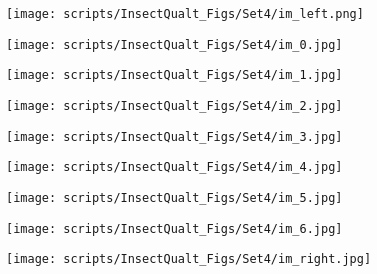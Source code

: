 \documentclass[10pt,twocolumn,letterpaper]{article}
\begin{document}
\begin{figure*}[t]
\begin{center}
    \begin{subfigure}[b]{0.1\textwidth}
        \centering
        \texttt{[image: scripts/InsectQualt\_Figs/Set4/im\_left.png]}
    \end{subfigure}
    \hfill
    \begin{subfigure}[b]{0.1\textwidth}
        \centering
        \texttt{[image: scripts/InsectQualt\_Figs/Set4/im\_0.jpg]}
    \end{subfigure}
    \hfill
    \begin{subfigure}[b]{0.1\textwidth}
        \centering
        \texttt{[image: scripts/InsectQualt\_Figs/Set4/im\_1.jpg]}
    \end{subfigure}
    \hfill
    \begin{subfigure}[b]{0.1\textwidth}
        \centering
        \texttt{[image: scripts/InsectQualt\_Figs/Set4/im\_2.jpg]}
    \end{subfigure}
    \hfill
    \begin{subfigure}[b]{0.1\textwidth}
        \centering
        \texttt{[image: scripts/InsectQualt\_Figs/Set4/im\_3.jpg]}
    \end{subfigure}
    \hfill
    \begin{subfigure}[b]{0.1\textwidth}
        \centering
        \texttt{[image: scripts/InsectQualt\_Figs/Set4/im\_4.jpg]}
    \end{subfigure}
    \hfill
    \begin{subfigure}[b]{0.1\textwidth}
        \centering
        \texttt{[image: scripts/InsectQualt\_Figs/Set4/im\_5.jpg]}
    \end{subfigure}
    \hfill
    \begin{subfigure}[b]{0.1\textwidth}
        \centering
        \texttt{[image: scripts/InsectQualt\_Figs/Set4/im\_6.jpg]}
    \end{subfigure}
    \hfill
    \begin{subfigure}[b]{0.1\textwidth}
        \centering
        \texttt{[image: scripts/InsectQualt\_Figs/Set4/im\_right.jpg]}
    \end{subfigure}
    



\end{center}
\end{figure*}
\end{document}
